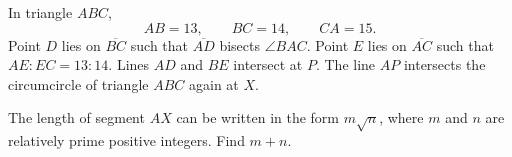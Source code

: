 In triangle $ABC$,\[
AB = 13, \qquad BC = 14, \qquad CA = 15.
\]Point $D$ lies on $\overline{BC}$ such that $\overline{AD}$ bisects $\angle BAC$. Point $E$ lies on $\overline{AC}$ such that $AE : EC = 13 : 14$. Lines $AD$ and $BE$ intersect at $P$. The line $AP$ intersects the circumcircle of triangle $ABC$ again at $X$.

The length of segment $AX$ can be written in the form $m\sqrt{n}$, where $m$ and $n$ are relatively prime positive integers. Find $m+n$.
